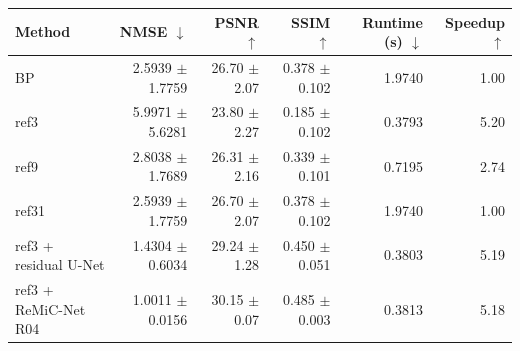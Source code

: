 \begin{tabular}{lrrrrr}
\toprule
Method & NMSE $\downarrow$ & PSNR $\uparrow$ & SSIM $\uparrow$ & Runtime (s) $\downarrow$ & Speedup $\uparrow$ \\
\midrule
BP & 2.5939 $\pm$ 1.7759 & 26.70 $\pm$ 2.07 & 0.378 $\pm$ 0.102 & 1.9740 & 1.00 \\
ref3 & 5.9971 $\pm$ 5.6281 & 23.80 $\pm$ 2.27 & 0.185 $\pm$ 0.102 & 0.3793 & 5.20 \\
ref9 & 2.8038 $\pm$ 1.7689 & 26.31 $\pm$ 2.16 & 0.339 $\pm$ 0.101 & 0.7195 & 2.74 \\
ref31 & 2.5939 $\pm$ 1.7759 & 26.70 $\pm$ 2.07 & 0.378 $\pm$ 0.102 & 1.9740 & 1.00 \\
ref3 + residual U-Net & 1.4304 $\pm$ 0.6034 & 29.24 $\pm$ 1.28 & 0.450 $\pm$ 0.051 & 0.3803 & 5.19 \\
ref3 + ReMiC-Net R04 & 1.0011 $\pm$ 0.0156 & 30.15 $\pm$ 0.07 & 0.485 $\pm$ 0.003 & 0.3813 & 5.18 \\
\bottomrule
\end{tabular}
